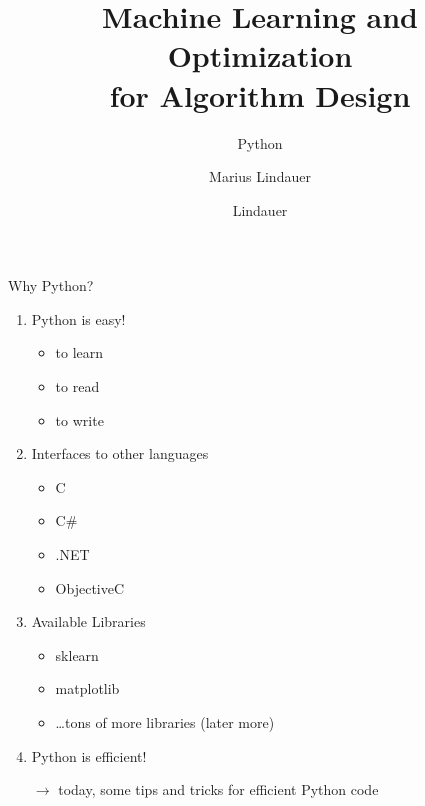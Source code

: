 \documentclass[t,handout]{beamer}
\title[MLOAD]{Machine Learning and Optimization\\ for Algorithm Design}
\subtitle{Python}
\author{Marius Lindauer}
\institute{University of Freiburg}
\date{}
\begin{document}
{
}
\author{Lindauer}
\institute{}
\logo{}

\begin{frame}{Why Python?}

\begin{enumerate}
  \item Python is easy!
  \begin{itemize}
   	\item to learn
   	\item to read
   	\item to write 
  \end{itemize}
  \pause
  \medskip
  \item Interfaces to other languages
  \begin{itemize}
    \item C
    \item C\#
    \item .NET
    \item ObjectiveC
  \end{itemize}
  \pause
  \medskip
  \item Available Libraries
  \begin{itemize}
    \item sklearn
    \item matplotlib
    \item \ldots tons of more libraries (later more)
  \end{itemize}
  \pause
  \medskip
  \item Python is efficient! 
  \item[$\to$] today, some tips and tricks for efficient Python code
\end{enumerate}

\end{frame}
\end{document}
